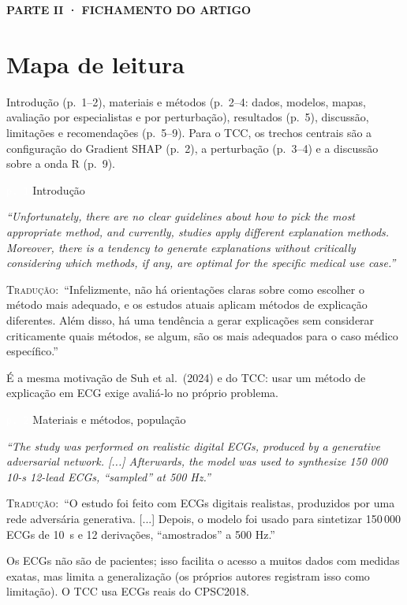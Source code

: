 \documentclass[11pt,a4paper]{article}
\newcommand{\pagechip}[1]{{\setlength{\fboxsep}{1.5pt}\colorbox{cAcc}{\textcolor{white}{\scriptsize\texttt{#1}}}}}
\newcommand{\partbar}[1]{\par\vspace{1.2em}\noindent\colorbox{black!80}{\parbox{\dimexpr\linewidth-2\fboxsep}{\color{white}\bfseries\sffamily\MakeUppercase{#1}}}\par\vspace{0.4em}}
\newenvironment{origquote}{\par\itshape\small}{\par}
\newenvironment{tradquote}{\par\small\textsc{Tradução:}\ }{\par}
\newcommand{\explab}[1]{\par\smallskip{\small\color{cAcc}\textbf{\MakeUppercase{#1}}}\par}
\begin{document}
\partbar{Parte II · Fichamento do artigo}

\section{Mapa de leitura}
Introdução (p.~1--2), materiais e métodos (p.~2--4: dados, modelos, mapas, avaliação por especialistas e por perturbação), resultados (p.~5), discussão, limitações e recomendações (p.~5--9). Para o TCC, os trechos centrais são a configuração do Gradient SHAP (p.~2), a perturbação (p.~3--4) e a discussão sobre a onda R (p.~9).

\begin{citacard}{\pagechip{p. 1} Introdução}
\begin{origquote}“Unfortunately, there are no clear guidelines about how to pick the most appropriate method, and currently, studies apply different explanation methods. Moreover, there is a tendency to generate explanations without critically considering which methods, if any, are optimal for the specific medical use case.”\end{origquote}
\begin{tradquote}“Infelizmente, não há orientações claras sobre como escolher o método mais adequado, e os estudos atuais aplicam métodos de explicação diferentes. Além disso, há uma tendência a gerar explicações sem considerar criticamente quais métodos, se algum, são os mais adequados para o caso médico específico.”\end{tradquote}
\explab{Explicação}
É a mesma motivação de Suh et al.\ (2024) e do TCC: usar um método de explicação em ECG exige avaliá-lo no próprio problema.
\end{citacard}

\begin{citacard}{\pagechip{p. 2} Materiais e métodos, população}
\begin{origquote}“The study was performed on realistic digital ECGs, produced by a generative adversarial network. [...] Afterwards, the model was used to synthesize 150 000 10-s 12-lead ECGs, “sampled” at 500 Hz.”\end{origquote}
\begin{tradquote}“O estudo foi feito com ECGs digitais realistas, produzidos por uma rede adversária generativa. [...] Depois, o modelo foi usado para sintetizar 150\,000 ECGs de 10~s e 12 derivações, “amostrados” a 500 Hz.”\end{tradquote}
\explab{Explicação}
Os ECGs não são de pacientes; isso facilita o acesso a muitos dados com medidas exatas, mas limita a generalização (os próprios autores registram isso como limitação). O TCC usa ECGs reais do CPSC2018.
\end{citacard}
\end{document}
